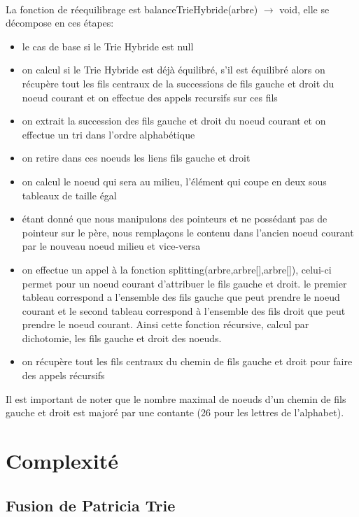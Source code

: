 \documentclass[a4paper,12pt]{report}
\begin{document}
\paragraph{}
La fonction de réequilibrage est balanceTrieHybride(arbre) $\rightarrow$ void, elle se décompose en ces étapes:
\begin{itemize}
 \item le cas de base si le Trie Hybride est null
 \item on calcul si le Trie Hybride est déjà équilibré, s'il est équilibré alors on récupère tout les fils centraux de la
 successions de fils gauche et droit du noeud courant et on effectue des appels recursifs sur ces fils
 \item on extrait la succession des fils gauche et droit du noeud courant et on effectue un tri dans l'ordre alphabétique
 \item on retire dans ces noeuds les liens fils gauche et droit
 \item on calcul le noeud qui sera au milieu, l'élément qui coupe en deux sous tableaux de taille égal
 \item étant donné que nous manipulons des pointeurs et ne possédant pas de pointeur sur le père, nous remplaçons le contenu
 dans l'ancien noeud courant par le nouveau noeud milieu et vice-versa
 \item on effectue un appel à la fonction splitting(arbre,arbre[],arbre[]), celui-ci permet pour un noeud courant d'attribuer le
 fils gauche et droit. le premier tableau correspond a l'ensemble des fils gauche que peut prendre le noeud courant et le second
 tableau correspond à l'ensemble des fils droit que peut prendre le noeud courant. Ainsi cette fonction récursive, calcul par
 dichotomie, les fils gauche et droit des noeuds.
 \item on récupère tout les fils centraux du chemin de fils gauche et droit pour faire des appels récursifs
\end{itemize}
Il est important de noter que le nombre maximal de noeuds d'un chemin de fils gauche et droit est majoré par une contante (26
pour les lettres de l'alphabet).

\section{Complexité}
\subsection{Fusion de Patricia Trie}
\end{document}

